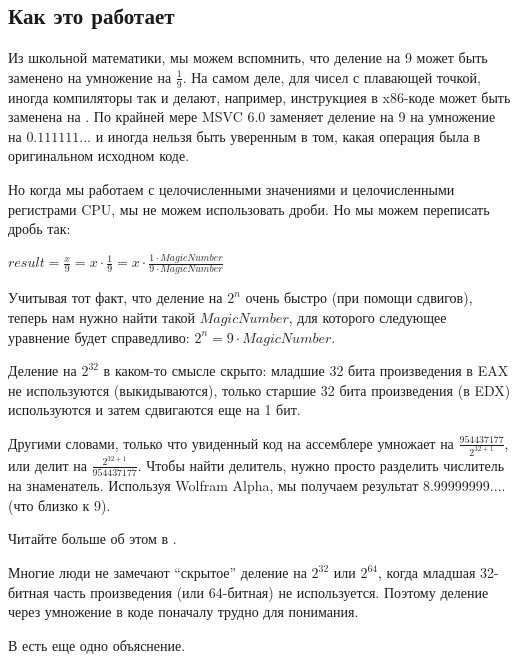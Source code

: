 ﻿\subsection{Как это работает}

Из школьной математики, мы можем вспомнить, что деление на 9 может быть заменено на умножение на $\frac{1}{9}$.
На самом деле, для чисел с плавающей точкой, иногда компиляторы так и делают,
например, инструкциея  в x86-коде может быть заменена на .
По крайней мере MSVC 6.0 заменяет деление на 9 на умножение на $0.111111...$ и иногда нельзя быть уверенным в том,
какая операция была в оригинальном исходном коде.

Но когда мы работаем с целочисленными значениями и целочисленными регистрами CPU, мы не можем использовать дроби.
Но мы можем переписать дробь так:

\begin{center}
$result = \frac{x}{9} = x \cdot \frac{1}{9} = x \cdot \frac{1 \cdot MagicNumber}{9 \cdot MagicNumber}$
\end{center}

Учитывая тот факт, что деление на $2^n$ очень быстро (при помощи сдвигов), теперь нам нужно найти такой $MagicNumber$,
для которого следующее уравнение будет справедливо: $2^n = 9 \cdot MagicNumber$.

Деление на $2^{32}$ в каком-то смысле скрыто: младшие 32 бита произведения в EAX не используются (выкидываются),
только старшие 32 бита произведения (в EDX) используются и затем сдвигаются еще на 1 бит.

Другими словами, только что увиденный код на ассемблере умножает на {\Large $\frac{954437177}{2^{32+1}}$},
или делит на {\Large $\frac{2^{32+1}}{954437177}$}.
Чтобы найти делитель, нужно просто разделить числитель на знаменатель.
Используя Wolfram Alpha, мы получаем результат 8.99999999.... (что близко к 9).


Читайте больше об этом в .

Многие люди не замечают ``скрытое'' деление на $2^{32}$ или $2^{64}$,
когда младшая 32-битная часть произведения (или 64-битная) не используется.
Поэтому деление через умножение в коде поначалу трудно для понимания.

В \MathForProg есть еще одно объяснение.

